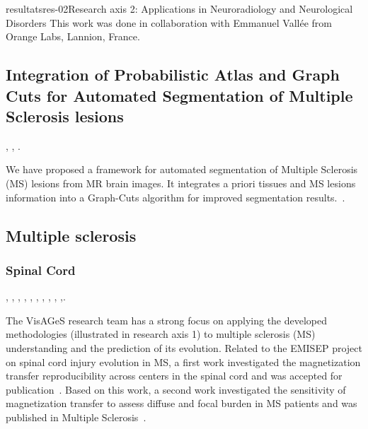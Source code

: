 \documentclass{ra2018}
\begin{document}
\begin{module}{resultats}{res-02}{Research axis 2: Applications in Neuroradiology and Neurological Disorders}
This work was done in collaboration with Emmanuel Vallée from Orange Labs, Lannion, France.

\subsection{Integration of Probabilistic Atlas and Graph Cuts for Automated Segmentation of Multiple Sclerosis lesions}
\begin{participants}
      ,
      ,
      .
\end{participants}
We have proposed a framework for automated segmentation of Multiple Sclerosis (MS) lesions
from MR brain images. It integrates a priori tissues and MS lesions information into a Graph-Cuts algorithm for improved segmentation results.~\cite{galassi:hal-01823801}.

\subsection{Multiple sclerosis}

\subsubsection{Spinal Cord}
\begin{participants}
      ,
      ,
      ,
      ,
      ,
      ,
      ,
      ,
      ,
      ,.
\end{participants}
The VisAGeS research team has a strong focus on applying the developed methodologies (illustrated in research axis 1) to multiple sclerosis (MS) understanding and the prediction of its evolution. Related to the EMISEP project on spinal cord injury evolution in MS, a first work investigated the magnetization transfer reproducibility across centers in the spinal cord and was accepted for publication~\cite{combes:hal-01934605}. Based on this work, a second work investigated the sensitivity of magnetization transfer to assess diffuse and focal burden in MS patients and was published in Multiple Sclerosis~\cite{combes:hal-01934621}.


\end{module}
\end{document}
